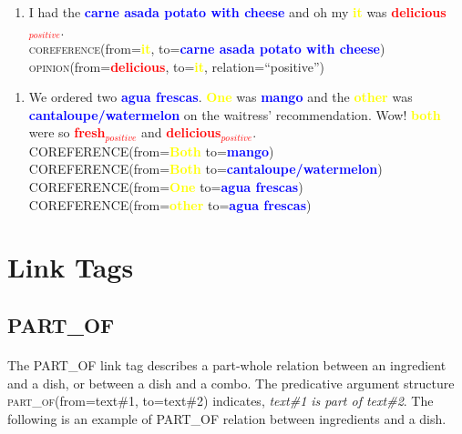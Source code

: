 \documentclass{article}
\begin{document}
\begin{enumerate}[resume]
	\item I had the \textbf{\textcolor{blue}{carne asada potato with cheese}} and oh my \textbf{\textcolor{yellow}{it}} was \textbf{\textcolor{red}{delicious$_{positive}$}}.\\
	\textsc{coreference}(from=\textbf{\textcolor{yellow}{it}}, to=\textbf{\textcolor{blue}{carne asada potato with cheese}})\\
		\textsc{opinion}(from=\textbf{\textcolor{red}{delicious}}, to=\textbf{\textcolor{yellow}{it}}, relation=``positive'')\\
\end{enumerate}

\begin{enumerate}[resume]
	\item We ordered two \textbf{\textcolor{blue}{agua frescas}}. \textbf{\textcolor{yellow}{One}} was  \textbf{\textcolor{blue}{mango}} and the \textbf{\textcolor{yellow}{other}} was 
	\textbf{\textcolor{blue}{cantaloupe/watermelon}} on the waitress' recommendation. Wow! 
	\textbf{\textcolor{yellow}{both}} were so 
	\textbf{\textcolor{red}{fresh$_{positive}$}} and 
	\textbf{\textcolor{red}{delicious$_{positive}$}}.\\
	
		\textsc{COREFERENCE}(from=\textbf{\textcolor{yellow}{Both}} to=\textbf{\textcolor{blue}{mango}}) \\
		\textsc{COREFERENCE}(from=\textbf{\textcolor{yellow}{Both}} to=\textbf{\textcolor{blue}{cantaloupe/watermelon}}) \\
		\textsc{COREFERENCE}(from=\textbf{\textcolor{yellow}{One}} to=\textbf{\textcolor{blue}{agua frescas}}) \\
		\textsc{COREFERENCE}(from=\textbf{\textcolor{yellow}{other}} to=\textbf{\textcolor{blue}{agua frescas}}) \\
	
\end{enumerate}

\newpage
\section{Link Tags}


\subsection{PART\_OF}
\paragraph{}
The PART\_OF link tag describes a part-whole relation between an ingredient and a dish, or between a dish and a combo. The predicative argument structure \textsc{part\_of}(from=text\#1, to=text\#2) indicates, \textit{text\#1 is part of text\#2}. The following is an example of PART\_OF relation between ingredients and a dish.
\end{document}
